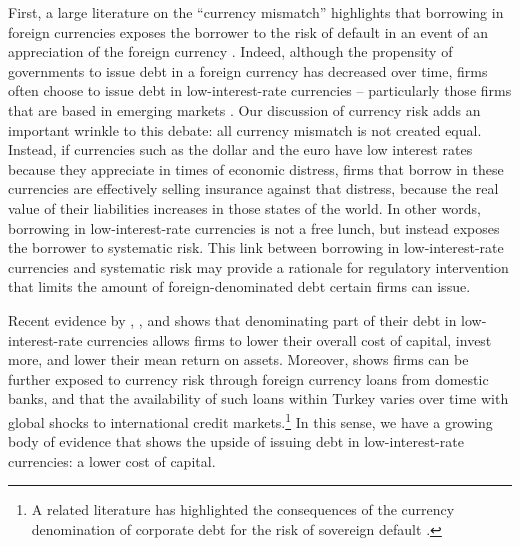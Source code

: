 \documentclass[11pt]{article}
\begin{document}
First, a large literature on the ``currency mismatch'' highlights that borrowing in foreign currencies exposes the borrower to the risk of default in an event of an appreciation of the foreign currency \citep[e.g]{EichengreenHausmann1999,cespedes2004balance}. Indeed, although the propensity of governments to issue debt in a foreign currency has decreased over time, firms often choose to issue debt in low-interest-rate currencies -- particularly those firms that are based in emerging markets \citep{DuSchreger2017}. Our discussion of currency risk adds an important wrinkle to this debate: all currency mismatch is not created equal. Instead, if currencies such as the dollar and the euro have low interest rates because they appreciate in times of economic distress, firms that borrow in these currencies are effectively selling insurance against that distress, because the real value of their liabilities increases in those states of the world. In other words, borrowing in low-interest-rate currencies is not a free lunch, but instead exposes the borrower to systematic risk. This link between borrowing in low-interest-rate currencies and systematic risk may provide a rationale for regulatory intervention that limits the amount of foreign-denominated debt certain firms can issue.

Recent evidence by \citet{liao2020}, \citet{Richers2020}, and \citet{SalomaoVarela2019} shows that denominating part of their debt in low-interest-rate currencies allows firms to lower their overall cost of capital, invest more, and lower their mean return on assets. Moreover, \citep{KalemliOzcanetal2019} shows firms can be further exposed to currency risk through foreign currency loans from domestic banks, and that the availability of such loans within Turkey varies over time with global shocks to international credit markets.\footnote{A related literature has highlighted the consequences of the currency denomination of corporate debt for the risk of sovereign default \citep{DuSchreger2017, OttonelloPerez2019}.} In this sense, we have a growing body of evidence that shows the upside of issuing debt in low-interest-rate currencies: a lower cost of capital. 
\end{document}
